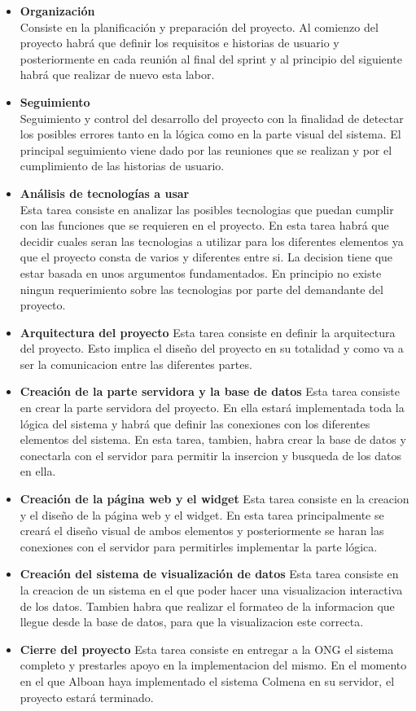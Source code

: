 \begin{itemize}
	\item \textbf{Organización}\\
	Consiste en la planificación y preparación del proyecto. Al comienzo del proyecto habrá que definir los requisitos e historias de usuario y posteriormente en cada reunión al final del sprint y al principio del siguiente habrá que realizar de nuevo esta labor. 
	\item \textbf{Seguimiento}\\
	Seguimiento y control del desarrollo del proyecto con la finalidad de detectar los posibles errores tanto en la lógica como en la parte visual del sistema. El principal seguimiento viene dado por las reuniones que se realizan y por el cumplimiento de las historias de usuario.	
	\item \textbf{Análisis de tecnologías a usar}\\
	Esta tarea consiste en analizar las posibles tecnologias que puedan cumplir con las funciones que se requieren en el proyecto. En esta tarea habrá que decidir cuales seran las tecnologias a utilizar para los diferentes elementos ya que el proyecto consta de varios y diferentes entre si. La decision tiene que estar basada en unos argumentos fundamentados. En principio no existe ningun requerimiento sobre las tecnologias por parte del demandante del proyecto.
	\item \textbf{Arquitectura del proyecto}\smallbreak
	Esta tarea consiste en definir la arquitectura del proyecto. Esto implica el diseño del proyecto en su totalidad y como va a ser la comunicacion entre las diferentes partes.
	\item \textbf{Creación de la parte servidora y la base de datos}\smallbreak
	Esta tarea consiste en crear la parte servidora del proyecto. En ella estará implementada toda la lógica del sistema y habrá que definir las conexiones con los diferentes elementos del sistema. En esta tarea, tambien, habra crear la base de datos y conectarla con el servidor para permitir la insercion y busqueda de los datos en ella.
	\item \textbf{Creación de la página web y el widget}\smallbreak
	Esta tarea consiste en la creacion y el diseño de la página web y el widget. En esta tarea principalmente se creará el diseño visual de ambos elementos y posteriormente se haran las conexiones con el servidor para permitirles implementar la parte lógica.
	\item \textbf{Creación del sistema de visualización de datos}\smallbreak
	Esta tarea consiste en la creacion de un sistema en el que poder hacer una visualizacion interactiva de los datos. Tambien habra que realizar el formateo de la informacion que llegue desde la base de datos, para que la visualizacion este correcta.
	\item \textbf{Cierre del proyecto}\smallbreak
	Esta tarea consiste en entregar a la ONG el sistema completo y prestarles apoyo en la implementacion del mismo. En el momento en el que Alboan haya implementado el sistema Colmena en su servidor, el proyecto estará terminado.
\end{itemize}

